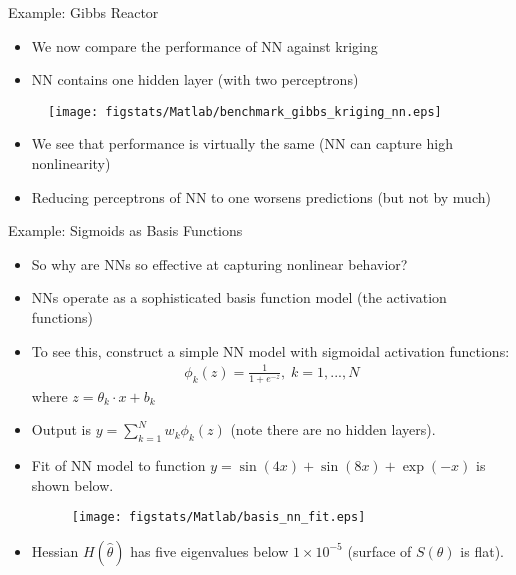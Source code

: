 \documentclass[9pt]{beamer}
\begin{document}
\begin{frame}{Example: Gibbs Reactor}

\begin{itemize}
\item We now compare the performance of NN against kriging
\item NN contains one hidden layer (with two perceptrons) 
\end{itemize}


\begin{figure}[!htb]
    \centering
	\texttt{[image: figstats/Matlab/benchmark\_gibbs\_kriging\_nn.eps]}
\end{figure}

\begin{itemize}
\item We see that performance is virtually the same (NN can capture high nonlinearity)
\item Reducing perceptrons of NN to one worsens predictions (but not by much)
\end{itemize}

\end{frame}

\begin{frame}{Example: Sigmoids as Basis Functions}

\begin{itemize}
\item So why are NNs so effective at capturing nonlinear behavior? 
\item NNs operate as a sophisticated basis function model (the activation functions)
\item To see this, construct a simple NN model with sigmoidal activation functions:
\begin{align*}
\phi_k(z)=\frac{1}{1+e^{-z}},\; k=1,...,N
\end{align*}
where $z=\theta_k\cdot x + b_k$ 
\item Output is $y=\sum_{k=1}^Nw_k\phi_k(z)$ (note there are no hidden layers).  
\item Fit of NN model to function $y=\sin(4x)+\sin(8x)+\exp(-x)$ is shown below.

\begin{figure}[!htb]
    \centering
	\texttt{[image: figstats/Matlab/basis\_nn\_fit.eps]}
\end{figure}

\item Hessian $H(\hat{\theta})$ has five eigenvalues below $1\times 10^{-5}$ (surface of $S(\theta)$ is flat). 
\end{itemize}

\end{frame}
\end{document}
